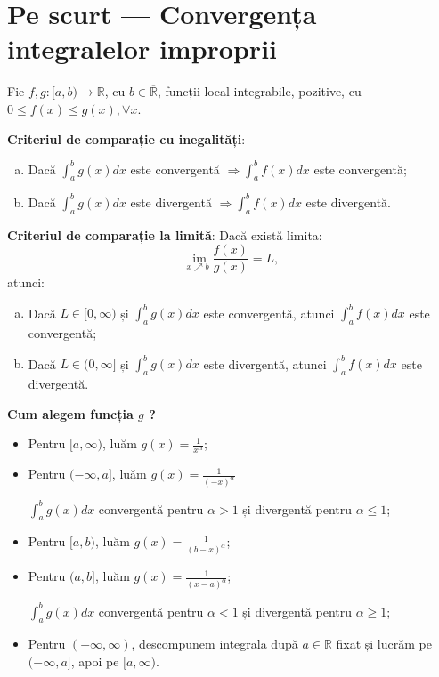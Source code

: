 \documentclass[11pt,a4paper]{article}
\newcommand\ds{\displaystyle}
\newcommand\RR{\mathbb{R}}
\theoremstyle{dotless}
\theoremstyle{dotlessdr}
\begin{document}
\section{Pe scurt --- Convergența integralelor improprii}


Fie $f, g : [a, b) \to \RR$, cu $b \in \overline{\RR}$, funcții local integrabile,
pozitive, cu $0 \leq f(x) \leq g(x), \forall x$.

\textbf{Criteriul de comparație cu inegalități}:
\begin{enumerate}[(a)]
\item Dacă $\ds\int_a^b g(x) dx$ este convergentă $\Rightarrow \ds\int_a^b f(x) dx$ este
  convergentă;
\item Dacă $\ds\int_a^b g(x) dx$ este divergentă $\Rightarrow \ds\int_a^b f(x) dx$ este
  divergentă.
\end{enumerate}

\textbf{Criteriul de comparație la limită}: Dacă există limita:
\[
  \ds\lim_{x \nearrow b} \frac{f(x)}{g(x)} = L,
\]
atunci:
\begin{enumerate}[(a)]
\item Dacă $L \in [0, \infty)$ și $\ds\int_a^b g(x)dx$ este convergentă, atunci
  $\ds\int_a^b f(x) dx$ este convergentă;
\item Dacă $L \in (0, \infty]$ și $\ds\int_a^b g(x) dx$ este divergentă, atunci
  $\ds\int_a^b f(x) dx$ este divergentă.
\end{enumerate}

\textbf{Cum alegem funcția $g$ ?}
\begin{itemize}
\item Pentru $[a, \infty)$, luăm $g(x) = \frac{1}{x^\alpha}$;
\item Pentru $(-\infty, a]$, luăm $g(x) = \frac{1}{(-x)^\alpha}$
  \begin{center}
    $\ds\int_a^b g(x) dx$ convergentă pentru $\alpha > 1$ și divergentă pentru $\alpha \leq 1$;
  \end{center}
\item Pentru $[a, b)$, luăm $g(x) = \frac{1}{(b - x)^\alpha}$;
\item Pentru $(a, b]$, luăm $g(x) = \frac{1}{(x - a)^\alpha}$;
  \begin{center}
    $\ds\int_a^b g(x) dx$ convergentă pentru $\alpha < 1$ și divergentă pentru $\alpha \geq 1$;
  \end{center}
\item Pentru $(-\infty, \infty)$, descompunem integrala după $a \in \RR$ fixat și lucrăm
  pe $(-\infty, a]$, apoi pe $[a, \infty)$.
\end{itemize}
\end{document}
